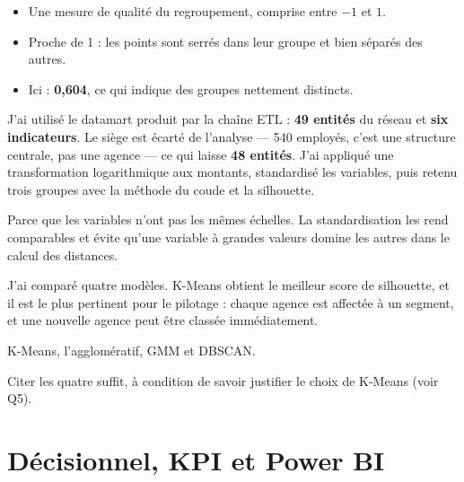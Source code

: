 \documentclass[a4paper,11pt]{article}
\begin{document}

\begin{itemize}[leftmargin=*,itemsep=1pt]
  \item Une mesure de qualité du regroupement, comprise entre $-1$ et $1$.
  \item Proche de 1 : les points sont serrés dans leur groupe et bien séparés des autres.
  \item Ici : \textbf{0,604}, ce qui indique des groupes nettement distincts.
\end{itemize}


J'ai utilisé le datamart produit par la chaîne ETL : \textbf{49 entités} du
réseau et \textbf{six indicateurs}. Le siège est écarté de l'analyse --- 540
employés, c'est une structure centrale, pas une agence --- ce qui laisse
\textbf{48 entités}. J'ai appliqué une transformation logarithmique aux
montants, standardisé les variables, puis retenu trois groupes avec la méthode
du coude et la silhouette.


Parce que les variables n'ont pas les mêmes échelles. La standardisation les
rend comparables et évite qu'une variable à grandes valeurs domine les autres
dans le calcul des distances.


J'ai comparé quatre modèles. K-Means obtient le meilleur score de silhouette, et
il est le plus pertinent pour le pilotage : chaque agence est affectée à un
segment, et une nouvelle agence peut être classée immédiatement.


K-Means, l'agglomératif, GMM et DBSCAN.

\begin{note}
\small Citer les quatre suffit, à condition de savoir justifier le choix de
K-Means (voir Q5).
\end{note}

\section{Décisionnel, KPI et Power BI}
\end{document}
